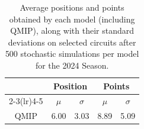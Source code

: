 \begin{table}[H]
\centering
\begin{tabular}{ccccc}
\toprule
\multicolumn{1}{l}{}               & \multicolumn{2}{c}{Position}   & \multicolumn{2}{c}{Points} \\ \cmidrule(lr){2-3}\cmidrule(lr){4-5}
\multicolumn{1}{c}{Model}          &    $\mu$ & $\sigma$ &   $\mu$  & $\sigma$ \\ \midrule
\multicolumn{1}{c}{QMIP          } &     6.00  &     3.03  &     8.89  &     5.09  \\
\bottomrule
\end{tabular}
\caption{Average positions and points obtained by each model (including QMIP), along with their standard deviations on selected circuits after 500 stochastic simulations per model for the 2024 Season.}
\label{tab:tab_qmip_vs_drl_stochastic_2024}
\end{table}